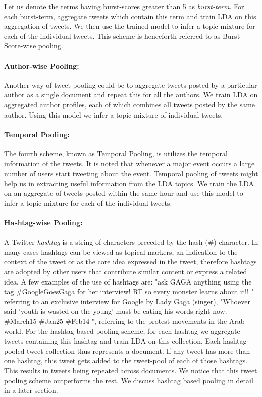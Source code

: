 \documentclass[10pt,a5paper,twoside]{article}
\begin{document}
Let us denote the terms having burst-scores greater than 5 as \textit{burst-term}. For each burst-term, aggregate tweets which contain this term and train LDA on this aggregation of tweets. We then use the trained model to infer a topic mixture for each of the individual tweets. This scheme is henceforth referred to as Burst Score-wise pooling.

\paragraph{Author-wise Pooling: }
Another way of tweet pooling could be to aggregate tweets posted by a particular author as a single document and repeat this for all the authors. We train LDA on aggregated author profiles, each of which combines all tweets posted by the same author. Using this model we infer a topic mixture of individual tweets.

\paragraph{Temporal Pooling: }
The fourth scheme, known as Temporal Pooling, is utilizes the temporal information of the tweets. It is noted that whenever a major event occurs a large number of users start tweeting about the event. Temporal pooling of tweets might help us in extracting useful information from the LDA topics. We train the LDA on an aggregate of tweets posted within the same hour and use this model to infer a topic mixture for each of the individual tweets.

\paragraph{Hashtag-wise Pooling:}
A Twitter \textit{hashtag} is a string of characters preceded by the hash (\#) character. In many cases hashtags can be viewed as topical markers, an indication to the context of the tweet or as the core idea expressed in the tweet, therefore hashtags are adopted by other users that contribute similar content or express a related idea. A few examples of the use of hashtags are: "ask GAGA anything using the tag \#GoogleGoesGaga for her interview! RT so every monster learns about it!! " referring to an exclusive interview for Google by Lady Gaga (singer), "Whoever
said 'youth is wasted on the young' must be eating his words right now. \#March15 \#Jan25 \#Feb14 ", referring to the protest movements in the Arab world.
For the hashtag based pooling scheme, for each hashtag we aggregate tweets containing this hashtag and train LDA on this collection. Each hashtag pooled tweet collection thus represents a document. If any tweet has more than one hashtag, this tweet gets added to the tweet-pool of each of those hashtags. This results in tweets being repeated across documents. We notice that this tweet pooling scheme outperforms the rest. We discuss hashtag based pooling in detail in a later section.
\end{document}
